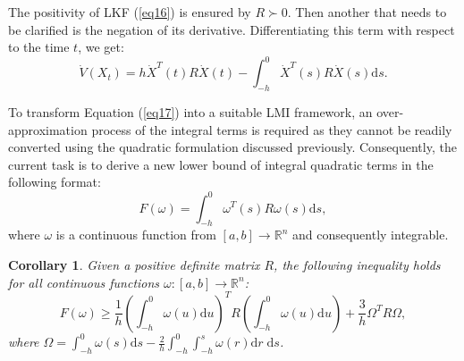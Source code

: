 \documentclass[journal]{IEEEtran}
\newtheorem{corollary}[theorem]{Corollary}
\begin{document}
The positivity of LKF (\ref{eq16}) is ensured by $ R \succ 0 $. Then another that needs to be clarified is the negation of its derivative. Differentiating this term with respect to the time $t$, we get:
\begin{equation}
  \dot V\left( {{X_t}} \right) = h{\dot X^T}(t)R\dot X(t) - \int_{ - h}^0 {{{\dot X}^T}} (s)R\dot X(s){\text{d}}s.
  \label{eq17}
\end{equation}

To transform Equation (\ref{eq17}) into a suitable LMI framework, an over-approximation process of the integral terms is required as they cannot be readily converted using the quadratic formulation discussed previously. Consequently, the current task is to derive a new lower bound of integral quadratic terms in the following format:
\begin{equation}
  F(\omega ) = \int_{ - h}^0 {{\omega ^T}} (s)R\omega (s){\text{d}}s,
  \label{eq18}
\end{equation}
where $ \omega  $ is a continuous function from $ [a,b] \to {\mathbb{R}^n} $ and consequently integrable.

\begin{corollary}
  \label{coro4}
  Given a positive definite matrix $ R $, the following inequality holds for all continuous functions $ \omega : [a,b] \to {\mathbb{R}^n} $:
  \begin{equation}
    F(\omega ) \geqslant \frac{1}{h}{\left( {\int_{ - h}^0 {\omega (u){\text{d}}u} } \right)^T}R\left( {\int_{ - h}^0 {\omega (u){\text{d}}u} } \right) + \frac{3}{h}{\Omega ^T}R\Omega,
    \label{eq19}
  \end{equation}
  where $ \Omega  = \int_{ - h}^0 {\omega (s){\text{d}}s}  - \frac{2}{h}\int_{ - h}^0 {\int_{ - h}^s {\omega (r){\text{d}}r\;{\text{d}}s} }  $.
\end{corollary}
\end{document}

